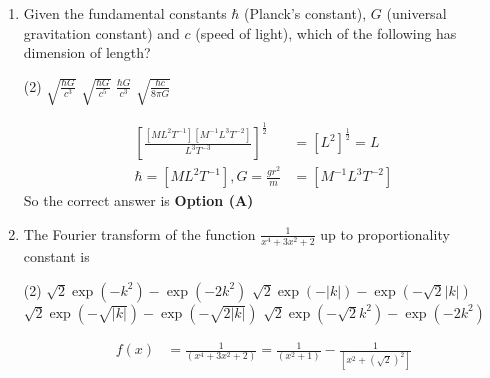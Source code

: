 \begin{enumerate}[label=\color{ocre}\textbf{\arabic*.}]
\begin{answer}
\begin{align*}
		\text{Hence, }c_{k}&=\frac{A}{2 \pi} \int_{-\pi}^{\pi} \sin ^{2}(\alpha x) d x\\&=-\frac{A}{8 \pi}\left[\int_{-\pi}^{\pi} e^{-i k x} e^{-i k x} d x-2 \int_{-\pi}^{\pi} e^{-i k x} d x+\int_{-\pi}^{\pi} e^{-i k x} e^{i k x} d x\right]\\
		&=-\frac{A}{8 \pi}\left[\int_{-\pi}^{\pi} e^{-2 i k x} d x-2 \int_{-\pi}^{\pi} e^{-i k x} d x+\int_{-\pi}^{\pi} d x\right]
		\intertext{The first two integrals are zero and the third integral has the value $2 \pi$.
			Thus,}
		c_{k}&=-\frac{A}{8 \pi}(2 \pi)=-\frac{A}{4}
		\end{align*}
		So the correct answer is \textbf{Option (B)}
	\end{answer}
	\item Given the fundamental constants $\hbar$ (Planck's constant), $G$ (universal gravitation constant) and $c$ (speed of light), which of the following has dimension of length?
	{}
	\begin{tasks}(2)
		\task[\textbf{A.}]$\sqrt{\frac{\hbar G}{c^{3}}}$
		\task[\textbf{B.}] $\sqrt{\frac{\hbar G}{c^{5}}}$
		\task[\textbf{C.}]$\frac{\hbar G}{c^{3}}$
		\task[\textbf{D.}] $\sqrt{\frac{\hbar c}{8 \pi G}}$
	\end{tasks}
	\begin{answer}
		\begin{align*}
		\left[\frac{\left[M L^{2} T^{-1}\right]\left[M^{-1} L^{3} T^{-2}\right]}{L^{3} T^{-3}}\right]^{\frac{1}{2}}&=\left[L^{2}\right]^{\frac{1}{2}}=L\\
		\hbar=\left[M L^{2} T^{-1}\right], G=\frac{g r^{2}}{m}&=\left[M^{-1} L^{3} T^{-2}\right]
		\end{align*}
		So the correct answer is \textbf{Option (A)}
	\end{answer}
	\item The Fourier transform of the function $\frac{1}{x^{4}+3 x^{2}+2}$ up to proportionality constant is
	{}
	\begin{tasks}(2)
		\task[\textbf{A.}]$\sqrt{2} \exp \left(-k^{2}\right)-\exp \left(-2 k^{2}\right)$
		\task[\textbf{B.}]$\sqrt{2} \exp (-|k|)-\exp (-\sqrt{2}|k|)$
		\task[\textbf{C.}]$\sqrt{2} \exp (-\sqrt{|k|})-\exp (-\sqrt{2|k|})$
		\task[\textbf{D.}]  $\sqrt{2} \exp \left(-\sqrt{2} k^{2}\right)-\exp \left(-2 k^{2}\right)$
	\end{tasks}
	\begin{answer}
		\begin{align*}
		f(x)&=\frac{1}{\left(x^{4}+3 x^{2}+2\right)}=\frac{1}{\left(x^{2}+1\right)}-\frac{1}{\left[x^{2}+(\sqrt{2})^{2}\right]}

\end{align*}
\end{answer}
\end{enumerate}
